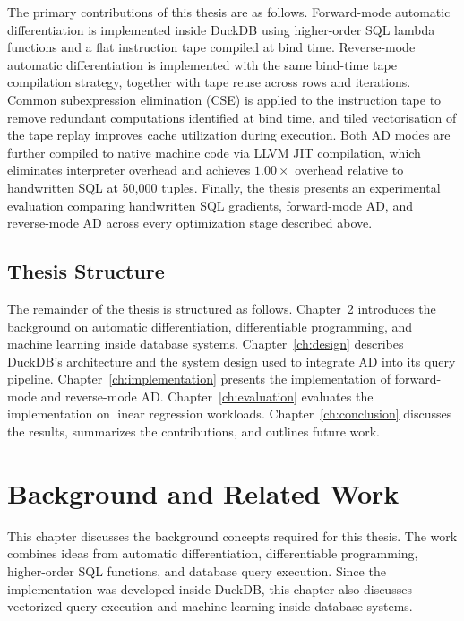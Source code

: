 \documentclass[12pt]{report}
\begin{document}
The primary contributions of this thesis are as follows. Forward-mode automatic
differentiation is implemented inside DuckDB using higher-order SQL lambda
functions and a flat instruction tape compiled at bind time. Reverse-mode
automatic differentiation is implemented with the same bind-time tape
compilation strategy, together with tape reuse across rows and iterations.
Common subexpression elimination (CSE) is applied to the instruction tape to
remove redundant computations identified at bind time, and tiled vectorisation
of the tape replay improves cache utilization during execution. Both AD modes
are further compiled to native machine code via LLVM JIT compilation, which
eliminates interpreter overhead and achieves $1.00\times$ overhead relative to
handwritten SQL at 50{,}000 tuples. Finally, the thesis presents an
experimental evaluation comparing handwritten SQL gradients, forward-mode AD,
and reverse-mode AD across every optimization stage described above.


\section{Thesis Structure}

The remainder of the thesis is structured as follows. Chapter~\ref{ch:background}
introduces the background on automatic differentiation, differentiable
programming, and machine learning inside database systems. Chapter~\ref{ch:design}
describes DuckDB's architecture and the system design used to integrate AD into
its query pipeline. Chapter~\ref{ch:implementation} presents the implementation
of forward-mode and reverse-mode AD. Chapter~\ref{ch:evaluation} evaluates the
implementation on linear regression workloads. Chapter~\ref{ch:conclusion}
discusses the results, summarizes the contributions, and outlines future work.



\chapter{Background and Related Work}
\label{ch:background}

This chapter discusses the background concepts required for this thesis. The work combines ideas from automatic differentiation, differentiable programming, higher-order SQL functions, and database query execution. Since the implementation was developed inside DuckDB, this chapter also discusses vectorized query execution and machine learning inside database systems.
\end{document}

